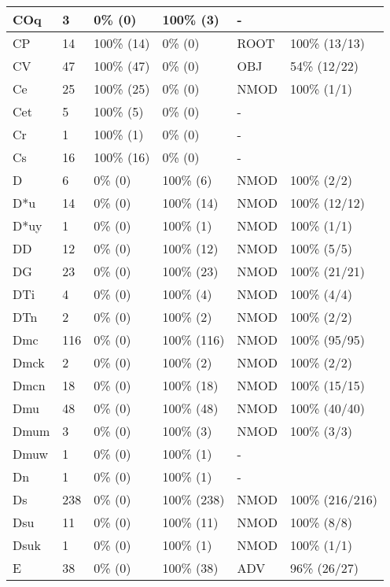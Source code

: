 \begin{figure*}
\begin{tabular}{|l|l|l|l||l|l|}
\hline
 COq & 3 & 0\% (0) & 100\% (3) & - &  \\ 
\hline
 CP & 14 & 100\% (14) & 0\% (0) & ROOT & 100\% (13/13) \\ 
\hline
 CV & 47 & 100\% (47) & 0\% (0) & OBJ & 54\% (12/22) \\ 
\hline
 Ce & 25 & 100\% (25) & 0\% (0) & NMOD & 100\% (1/1) \\ 
\hline
 Cet & 5 & 100\% (5) & 0\% (0) & - &  \\ 
\hline
 Cr & 1 & 100\% (1) & 0\% (0) & - &  \\ 
\hline
 Cs & 16 & 100\% (16) & 0\% (0) & - &  \\ 
\hline
 D & 6 & 0\% (0) & 100\% (6) & NMOD & 100\% (2/2) \\ 
\hline
 D*u & 14 & 0\% (0) & 100\% (14) & NMOD & 100\% (12/12) \\ 
\hline
 D*uy & 1 & 0\% (0) & 100\% (1) & NMOD & 100\% (1/1) \\ 
\hline
 DD & 12 & 0\% (0) & 100\% (12) & NMOD & 100\% (5/5) \\ 
\hline
 DG & 23 & 0\% (0) & 100\% (23) & NMOD & 100\% (21/21) \\ 
\hline
 DTi & 4 & 0\% (0) & 100\% (4) & NMOD & 100\% (4/4) \\ 
\hline
 DTn & 2 & 0\% (0) & 100\% (2) & NMOD & 100\% (2/2) \\ 
\hline
 Dmc & 116 & 0\% (0) & 100\% (116) & NMOD & 100\% (95/95) \\ 
\hline
 Dmck & 2 & 0\% (0) & 100\% (2) & NMOD & 100\% (2/2) \\ 
\hline
 Dmcn & 18 & 0\% (0) & 100\% (18) & NMOD & 100\% (15/15) \\ 
\hline
 Dmu & 48 & 0\% (0) & 100\% (48) & NMOD & 100\% (40/40) \\ 
\hline
 Dmum & 3 & 0\% (0) & 100\% (3) & NMOD & 100\% (3/3) \\ 
\hline
 Dmuw & 1 & 0\% (0) & 100\% (1) & - &  \\ 
\hline
 Dn & 1 & 0\% (0) & 100\% (1) & - &  \\ 
\hline
 Ds & 238 & 0\% (0) & 100\% (238) & NMOD & 100\% (216/216) \\ 
\hline
 Dsu & 11 & 0\% (0) & 100\% (11) & NMOD & 100\% (8/8) \\ 
\hline
 Dsuk & 1 & 0\% (0) & 100\% (1) & NMOD & 100\% (1/1) \\ 
\hline
 E & 38 & 0\% (0) & 100\% (38) & ADV & 96\% (26/27) \\ 
\hline
\end{tabular}
\end{figure*}
